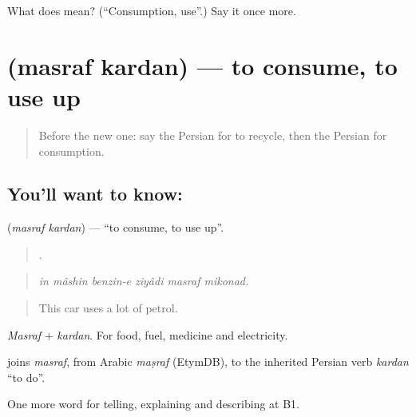 \begin{tcolorbox}[breakable,colback=teal!4,colframe=teal!35!black,title={Before you move on}]
What does  mean? (\textquotedblleft{}Consumption, use\textquotedblright{}.) Say it once more.
\end{tcolorbox}
\section[\texorpdfstring{\fa{مصرف} \fa{کردن} (masraf kardan)}{مصرف کردن (masraf kardan)}]{  (masraf kardan) — to consume, to use up}

\label{lesson:FA-C388-masraf-kardan}



\begin{quote}
Before the new one: say the Persian for to recycle, then the Persian for consumption.
\end{quote}

\subsection*{You'll want to know:  }
\textbf{ } (\emph{masraf kardan}) — \textquotedblleft{}to consume, to use up\textquotedblright{}.

\begin{quote}
     .
\end{quote}

\begin{quote}
\emph{in mâshin benzin-e ziyâdi masraf mikonad.}
\end{quote}

\begin{quote}
This car uses a lot of petrol.
\end{quote}

\emph{Masraf} + \emph{kardan}. For food, fuel, medicine and electricity.

\begin{cousinweb}
\textbf{ } joins \emph{masraf}, from Arabic \emph{maṣraf} (EtymDB), to the inherited Persian verb \emph{kardan} \textquotedblleft{}to do\textquotedblright{}.
\end{cousinweb}

\begin{grammarlens}[title={What you've built}]
One more word for telling, explaining and describing at B1.
\end{grammarlens}

